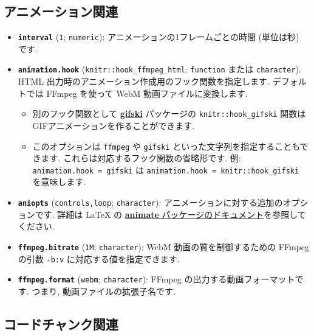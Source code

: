 \documentclass[
  lualatex,ja=standard,jafont=noto-otf]{bxjsreport}
\providecommand{\tightlist}{%
  \setlength{\itemsep}{0pt}\setlength{\parskip}{0pt}}
\begin{document}
\hypertarget{animation}{%
\subsection{アニメーション関連}\label{animation}}

\begin{itemize}
\tightlist
\item
  \textbf{\texttt{interval}} (\texttt{1}; \texttt{numeric}):
  アニメーションの1フレームごとの時間 (単位は秒) です.
\item
  \textbf{\texttt{animation.hook}} (\texttt{knitr::hook\_ffmpeg\_html};
  \texttt{function} または \texttt{character}). HTML
  出力時のアニメーション作成用のフック関数を指定します. デフォルトでは
  FFmpeg を使って WebM 動画ファイルに変換します.

  \begin{itemize}
  \tightlist
  \item
    別のフック関数として
    \href{https://cran.r-project.org/package=gifski}{\textbf{gifski}}
    パッケージの \texttt{knitr::hook\_gifski}
    関数はGIFアニメーションを作ることができます.
  \item
    このオプションは \texttt{\textquotesingle{}ffmpeg\textquotesingle{}}
    や \texttt{\textquotesingle{}gifski\textquotesingle{}}
    といった文字列を指定することもできます.
    これらは対応するフック関数の省略形です. 例:
    \texttt{animation.hook\ =\ \textquotesingle{}gifski\textquotesingle{}}
    は \texttt{animation.hook\ =\ knitr::hook\_gifski} を意味します.
  \end{itemize}
\item
  \textbf{\texttt{aniopts}}
  (\texttt{\textquotesingle{}controls,loop\textquotesingle{}};
  \texttt{character}): アニメーションに対する追加のオプションです.
  詳細は LaTeX の \href{http://ctan.org/pkg/animate}{\textbf{animate}
  パッケージのドキュメント}を参照してください.
\item
  \textbf{\texttt{ffmpeg.bitrate}} (\texttt{1M}; \texttt{character}):
  WebM 動画の質を制御するための FFmpeg の引数 \texttt{-b:v}
  に対応する値を指定できます.
\item
  \textbf{\texttt{ffmpeg.format}} (\texttt{webm}; \texttt{character}):
  FFmpeg の出力する動画フォーマットです. つまり,
  動画ファイルの拡張子名です.
\end{itemize}

\hypertarget{code-chunk}{%
\subsection{コードチャンク関連}\label{code-chunk}}
\end{document}
